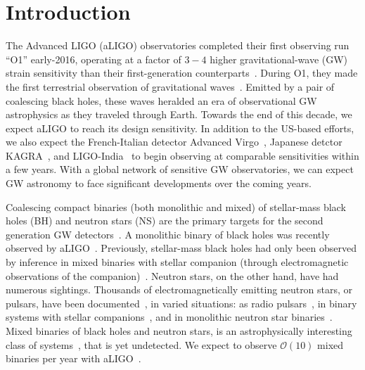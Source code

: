 \documentclass[aps,prd,amsmath,floats,floatfix, twocolumn,
superscriptaddress,nofootinbib,showpacs]{revtex4-1}
\newcommand{\red}{\textcolor{red}}
\begin{document}
\maketitle

\section{Introduction}\label{s1:introduction}

The Advanced LIGO (aLIGO) observatories completed their first observing run ``O1''
early-2016, operating at a factor of $3-4$ higher gravitational-wave
(GW) strain sensitivity than their first-generation 
counterparts~\cite{Shoemaker2009}.
% 
During O1, they made the first terrestrial observation of gravitational 
waves~\cite{LIGOVirgo2016a}. Emitted by a pair of coalescing black holes, these
waves heralded an era of observational GW astrophysics as they traveled 
through Earth.
% 
Towards the end of this decade, we expect aLIGO to reach its design sensitivity.
In addition to the US-based efforts, we also expect the French-Italian detector Advanced
Virgo~\cite{aVIRGO,aVirgo2}, Japanese detctor KAGRA~\cite{kagra,Somiya:2011np},
and LIGO-India~\cite{2013IJMPD..2241010U} to begin observing at comparable
sensitivities within a few years. With a global network of sensitive GW
 observatories, we can expect GW astronomy to face significant developments over the
coming years.
% 

Coalescing compact binaries (both monolithic and mixed) of stellar-mass black
holes (BH) and neutron stars (NS) are the primary targets for the second
generation GW detectors~\cite{Timmes:1995kp,Fryer:1999mi,RevModPhys.74.1015,
2010ApJ...714.1217B,2010ApJ...715L.138B,Dominik:2014yma,Belczynski:2006zi,
2012ApJ...749...91F,
Wex:1998wt,1991ApJ...379L..17N,Mandel:2015spa,Abbott:2016nhf}.
A monolithic binary of black holes was recently observed by 
aLIGO~\cite{LIGOVirgo2016a}. Previously, stellar-mass black holes had only 
been observed by inference in mixed binaries with stellar companion (through
electromagnetic observations of the companion)~\cite{Lewin2010,
Remillard:2006fc,Fragos:2010tm}.
Neutron stars, on the other hand, have had numerous sightings. Thousands of
electromagnetically emitting neutron stars, or pulsars, have been 
documented~\cite{Manchester:2004bp},
in varied situations: as radio pulsars~\cite{Lattimer:2012nd,Manchester:2004bp},
in binary systems with stellar companions~\cite{1971ApJ...169L..23M,
Bond:2002eh,Lattimer:2012nd,Manchester:2004bp},
and in monolithic neutron star binaries~\cite{Hulse:1975uf,Taylor:1982wi,
Weisberg:2010zz,Lattimer:2012nd,Manchester:2004bp}.
Mixed binaries of black holes and neutron stars, is an astrophysically
interesting class of systems~\cite{Wex:1998wt,
1991ApJ...379L..17N,Janka1999,Fryer:2015jpa}, that is yet undetected.
We expect to observe $\mathcal{O}(10)$ mixed binaries per year with
aLIGO~\cite{Abadie:2010cf}.
\end{document}
